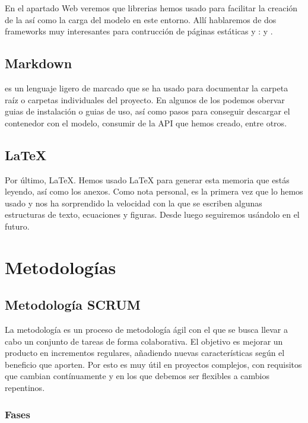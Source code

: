 En el apartado Web veremos que librerias hemos usado para facilitar la creación de la  así como la carga del modelo en este entorno. Allí hablaremos de dos frameworks muy interesantes para contrucción de páginas estáticas y :  y .

\subsection{Markdown}

 es un lenguaje ligero de marcado que se ha usado para documentar la carpeta raíz o carpetas individuales del proyecto. En algunos de los  podemos obervar guias de instalación o guias de uso, así como pasos para conseguir descargar el contenedor con el modelo, consumir de la API que hemos creado, entre otros.

\subsection{\LaTeX}

Por último, LaTeX. Hemos usado LaTeX para generar esta memoria que estás leyendo, así como los anexos. Como nota personal, es la primera vez que lo hemos usado y nos ha sorprendido la velocidad con la que se escriben algunas estructuras de texto, ecuaciones y figuras. Desde luego seguiremos usándolo en el futuro.


\section{Metodologías}

\subsection{Metodología SCRUM}

La metodología  es un proceso de metodología ágil con el que se busca llevar a cabo un conjunto de tareas de forma colaborativa. El objetivo es mejorar un producto en incrementos regulares, añadiendo nuevas características según el beneficio que aporten. Por esto es muy útil en proyectos complejos, con requisitos que cambian contínuamente y en los que debemos ser flexibles a cambios repentinos.

\subsubsection{Fases}

